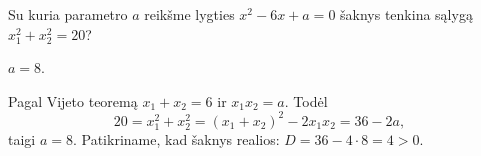 \begin{salyga}
Su kuria parametro $a$ reikšme lygties $x^2 - 6x + a = 0$ šaknys tenkina sąlygą $x_1^2 + x_2^2 = 20$?
\end{salyga}

\begin{atsakymas}
$a=8$.
\end{atsakymas}

\begin{sprendimas}
Pagal Vijeto teoremą $x_1+x_2=6$ ir $x_1x_2=a$. Todėl
\[
20=x_1^2+x_2^2=(x_1+x_2)^2-2x_1x_2=36-2a,
\]
taigi $a=8$. Patikriname, kad šaknys realios: $D=36-4\cdot8=4>0$.
\end{sprendimas}
